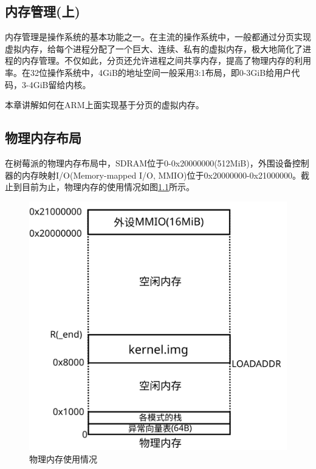 \documentclass[main.tex]{subfiles}
\begin{document}
\ifxetex\else\begin{CJK*}{UTF8}{song}\fi

\chapter{内存管理(上)}
内存管理是操作系统的基本功能之一。在主流的操作系统中，一般都通过分页实现虚拟内存，给每个进程分配了一个巨大、连续、私有的虚拟内存，极大地简化了进程的内存管理。不仅如此，分页还允许进程之间共享内存，提高了物理内存的利用率。在32位操作系统中，4GiB的地址空间一般采用3:1布局，即0-3GiB给用户代码，3-4GiB留给内核。

\par
本章讲解如何在ARM上面实现基于分页的虚拟内存。

\section{物理内存布局}
在树莓派的物理内存布局中，SDRAM位于0-0x20000000(512MiB)，外围设备控制器的内存映射I/O(Memory-mapped I/O, MMIO)位于0x20000000-0x21000000。截止到目前为止，物理内存的使用情况如图\ref{figure:4-1}所示。

\begin{figure}[htp]
\centering
\includegraphics[scale=0.4]{figures/4-1}
\caption{物理内存使用情况}
\label{figure:4-1}
\end{figure}


\end{CJK*}
\end{document}

